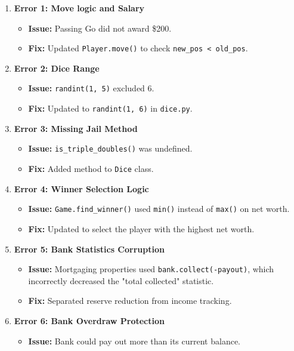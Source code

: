 \documentclass{article}
\begin{document}
\begin{enumerate}
    \item \textbf{Error 1: Move logic and Salary}
    \begin{itemize}
        \item \textbf{Issue:} Passing Go did not award \$200.
        \item \textbf{Fix:} Updated \texttt{Player.move()} to check \texttt{new_pos < old_pos}.
    \end{itemize}
    \item \textbf{Error 2: Dice Range}
    \begin{itemize}
        \item \textbf{Issue:} \texttt{randint(1, 5)} excluded 6.
        \item \textbf{Fix:} Updated to \texttt{randint(1, 6)} in \texttt{dice.py}.
    \end{itemize}
    \item \textbf{Error 3: Missing Jail Method}
    \begin{itemize}
        \item \textbf{Issue:} \texttt{is_triple_doubles()} was undefined.
        \item \textbf{Fix:} Added method to \texttt{Dice} class.
    \end{itemize}
    \item \textbf{Error 4: Winner Selection Logic}
    \begin{itemize}
        \item \textbf{Issue:} \texttt{Game.find_winner()} used \texttt{min()} instead of \texttt{max()} on net worth.
        \item \textbf{Fix:} Updated to select the player with the highest net worth.
    \end{itemize}
    \item \textbf{Error 5: Bank Statistics Corruption}
    \begin{itemize}
        \item \textbf{Issue:} Mortgaging properties used \texttt{bank.collect(-payout)}, which incorrectly decreased the "total collected" statistic.
        \item \textbf{Fix:} Separated reserve reduction from income tracking.
    \end{itemize}
    \item \textbf{Error 6: Bank Overdraw Protection}
    \begin{itemize}
        \item \textbf{Issue:} Bank could pay out more than its current balance.

\end{itemize}
\end{enumerate}
\end{document}
